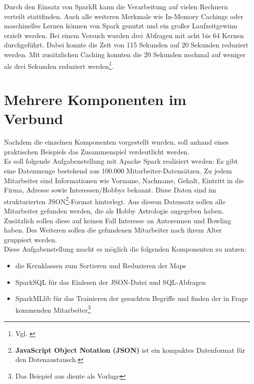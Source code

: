 \noindent
Durch den Einsatz von SparkR kann die Verarbeitung auf vielen Rechnern verteilt stattfinden. Auch alle weiteren Merkmale wie In-Memory Cachings oder maschinelles Lernen können von Spark genutzt und ein großer Laufzeitgewinn erzielt werden. Bei einem Versuch wurden drei Abfragen mit acht bis 64 Kernen durchgeführt. Dabei konnte die Zeit von 115 Sekunden auf 20 Sekunden reduziert werden. Mit zusätzlichen Caching konnten die 20 Sekunden nochmal auf weniger als drei Sekunden reduziert werden\footnote{Vgl. \cite{VYL+16}}.



\newpage
\section{Mehrere Komponenten im Verbund}\label{sec_verbund}

Nachdem die einzelnen Komponenten vorgestellt wurden, soll anhand eines praktischen Beispiels das Zusammenspiel verdeutlicht werden. \\

\noindent
Es soll folgende Aufgabenstellung mit Apache Spark realisiert werden: Es gibt eine Datenmenge bestehend aus 100.000 Mitarbeiter-Datensätzen. Zu jedem Mitarbeiter sind Informationen wie Vorname, Nachname, Gehalt, Eintritt in die Firma, Adresse sowie Interessen/Hobbys bekannt. Diese Daten sind im strukturierten JSON\footnote{\textbf{JavaScript Object Notation (JSON)} ist ein kompaktes Datenformat für den Datenaustausch. }-Format hinterlegt. 
Aus diesem Datensatz sollen alle Mitarbeiter gefunden werden, die als Hobby Astrologie angegeben haben. Zusätzlich sollen diese auf keinen Fall Interesse an Autorennen und Bowling haben. Des Weiteren sollen die gefundenen Mitarbeiter nach ihrem Alter gruppiert werden. \\
Diese Aufgabenstellung macht es möglich die folgenden Komponenten zu nutzen:
\begin{itemize}
	\item die Kernklassen zum Sortieren und Reduzieren der Maps
	\item SparkSQL für das Einlesen der JSON-Datei und SQL-Abfragen
	\item SparkMLlib für das Trainieren der gesuchten Begriffe und finden der in Frage kommenden Mitarbeiter\footnote{Das Beispiel aus \cite{GITHUB_EXAMPLE} diente als Vorlage}	
\end{itemize}  

